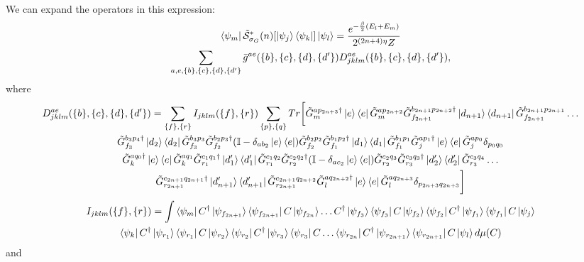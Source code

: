 \documentclass[aps,floatfix,10pt,amssymb,amsfont,amsmath,superscriptaddress,float,nofootinbib,longbibliography,nobalancelastpage,twocolumn]{revtex4-2}
\begin{document}
\begin{widetext}
\begin{multline}
    \label{eq:Bstarexpanded}
\end{multline}
We can expand the operators in this expression:
\begin{multline}
    \bra{\psi_m}\tilde{\mathcal{S}}^*_{\sigma_G}(n)[\ket{\psi_j}\bra{\psi_k}]\ket{\psi_l} = \frac{e^{-\frac{\beta}{2}(E_l+E_m)}}{2^{(2n+4)\eta}Z}\\\sum_{a,e,\{b\},\{c\},\{d\},\{d'\}} \bar g^{ae}(\{b\},\{c\},\{d\},\{d'\}) D^{ae}_{jklm}(\{b\},\{c\},\{d\},\{d'\}),
    \label{eq:B*def}
\end{multline}
where 
\begin{multline}
    D^{ae}_{jklm}(\{b\},\{c\},\{d\},\{d'\}) =  \sum_{\{f\}, \{r\}}  I_{jklm}(\{f\},\{r\})
    \sum_{\{p\},\{q\}}
Tr\bigg[\tilde G^{ap_{2n+3}\dagger}_m\ket{e}\bra{e}\tilde G^{ap_{2n+2}}_m\tilde G^{b_{2n+1}p_{2n+2}\dagger}_{f_{2n+1}}\ket{d_{n+1}}\bra{d_{n+1}}\tilde G^{b_{2n+1}p_{2n+1}}_{f_{2n+1}}\ldots\\ \tilde G^{b_3p_4\dagger}_{f_3}\ket{d_2}\bra{d_2}\tilde G^{b_3p_3}_{f_3}\tilde G^{b_2p_3\dagger}_{f_2}(\mathbb{I} - \delta_{ab_2}\ket{e}\bra{e})\tilde G^{b_2p_2}_{f_2}\tilde G^{b_1p_2\dagger}_{f_1}\ket{d_1}\bra{d_1}\tilde G^{b_1p_1}_{f_1}\tilde G^{ap_1\dagger}_j\ket{e}\bra{e}\tilde G^{ap_0}_j\delta_{p_0q_0}\\
\tilde G^{aq_0\dagger}_k\ket{e}\bra{e}\tilde G^{aq_1}_k\tilde G^{c_1q_1\dagger}_{r_1}\ket{d'_1}\bra{d'_1}\tilde G^{c_1q_2}_{r_1}\tilde G^{c_2q_2\dagger}_{r_2}(\mathbb{I} - \delta_{ac_2}\ket{e}\bra{e})\tilde G^{c_2q_3}_{r_2}\tilde G^{c_3q_3\dagger}_{r_3}\ket{d'_2}\bra{d'_2}\tilde G^{c_3q_4}_{r_3}\ldots\\
\tilde G^{c_{2n+1}q_{2n+1}\dagger}_{r_{2n+1}}\ket{d'_{n+1}}\bra{d'_{n+1}}\tilde G^{c_{2n+1}q_{2n+2}}_{r_{2n+1}}\tilde G^{aq_{2n+2}\dagger}_l\ket{e}\bra{e}\tilde G^{aq_{2n+3}}_l \delta_{p_{2n+3}q_{2n+3}}\bigg]
\end{multline}
\begin{multline}
I_{jklm}(\{f\},\{r\})=\int\bra{\psi_{m}}C^{\dagger}\ket{\psi_{f_{2n+1}}}\bra{\psi_{f_{2n+1}}}C\ket{\psi_{f_{2n}}}\ldots C^{\dagger}\ket{\psi_{f_3}}\bra{\psi_{f_3}}C\ket{\psi_{f_2}}\bra{\psi_{f_2}}C^{\dagger}\ket{\psi_{f_1}}\bra{\psi_{f_1}}C\ket{\psi_j}
\\\bra{\psi_k}C^{\dagger}\ket{\psi_{r_1}}\bra{\psi_{r_1}}C\ket{\psi_{r_2}}\bra{\psi_{r_2}}C^{\dagger}\ket{\psi_{r_3}}\bra{\psi_{r_3}}C\ldots \bra{\psi_{r_{2n}}}C^{\dagger}\ket{\psi_{r_{2n+1}}}\bra{\psi_{r_{2n+1}}}C\ket{\psi_{l}}d\mu(C)
\end{multline}
and
\begin{equation}

\end{equation}
\end{widetext}
\end{document}
